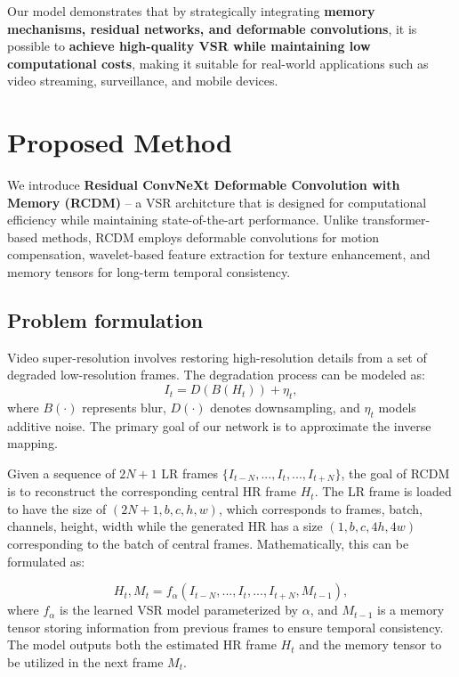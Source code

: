\documentclass[11pt]{article}
\begin{document}
Our model demonstrates that by strategically integrating \textbf{memory mechanisms, residual networks, and deformable convolutions}, it is possible to \textbf{achieve high-quality VSR while maintaining low computational costs}, making it suitable for real-world applications such as video streaming, surveillance, and mobile devices.

\section{Proposed Method}
\label{sec:method}


We introduce \textbf{Residual ConvNeXt Deformable Convolution with Memory (RCDM)} -- a VSR architcture that is designed for computational efficiency while maintaining state-of-the-art performance. Unlike transformer-based methods, RCDM employs deformable convolutions for motion compensation, wavelet-based feature extraction for texture enhancement, and memory tensors for long-term temporal consistency.

\subsection{Problem formulation} Video super-resolution involves restoring high-resolution details from a set of degraded low-resolution frames. The degradation process can be modeled as:
\begin{equation}
    I_t = D(B(H_t)) + \eta_t,
\end{equation}
where \( B(\cdot) \) represents blur, \( D(\cdot) \) denotes downsampling, and \( \eta_t \) models additive noise. The primary goal of our network is to approximate the inverse mapping.

Given a sequence of $2N+1$ LR frames $\{I_{t-N}, ..., I_t, ..., I_{t+N}\}$, the goal of RCDM is to reconstruct the corresponding central HR frame $H_t$. The LR frame is loaded to have the size of $(2N+1,b,c,h,w)$, which corresponds to frames, batch, channels, height, width while the generated HR has a size $(1,b,c,4h,4w)$ corresponding to the batch of central frames. Mathematically, this can be formulated as:

\begin{equation}
    H_t, M_t = f_{\alpha}(I_{t-N}, ..., I_t, ..., I_{t+N}, M_{t-1}),
    \label{eq:vsr_function}
\end{equation}
where $f_{\alpha}$ is the learned VSR model parameterized by $\alpha$, and $M_{t-1}$ is a memory tensor storing information from previous frames to ensure temporal consistency. The model outputs both the estimated HR frame $H_t$ and the memory tensor to be utilized in the next frame $M_t$.
\end{document}
